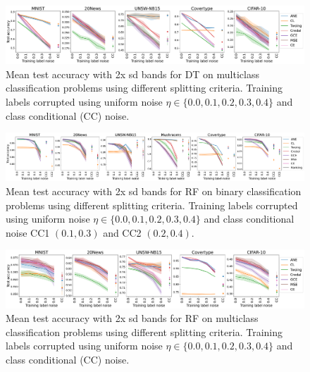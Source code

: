 \documentclass[letterpaper]{article} %
\begin{document}
\begin{figure}[h!]
    \centering
    \includegraphics[width=0.87\linewidth]{figs/multiclass_classification,DT_classfier.pdf}
    \caption{
    Mean test accuracy with 2x sd bands for DT on multiclass classification problems using different splitting criteria.   
    Training labels corrupted using uniform noise $\eta\in\{0.0,0.1,0.2,0.3,0.4\}$ and class conditional (CC) noise.
    }
    \label{fig:dt-mc}
\end{figure}

\begin{figure}[h!]
    \centering
    \includegraphics[width=0.97\linewidth]{figs/binary_classification,RF_classfier.pdf}
    \caption{
    Mean test accuracy with 2x sd bands for RF on binary classification problems using different splitting criteria.   
    Training labels corrupted using 
    uniform noise $\eta\in\{0.0,0.1,0.2,0.3,0.4\}$ and class conditional noise CC1 $(0.1,0.3)$ and CC2 $(0.2,0.4)$.
    }
    \label{fig:rf-bin}
\end{figure}

\begin{figure}[h!]
    \centering
    \includegraphics[width=0.87\linewidth]{figs/multiclass_classification,RF_classfier.pdf}
    \caption{
    Mean test accuracy with 2x sd bands for RF on multiclass classification problems using different splitting criteria.   
    Training labels corrupted using uniform noise $\eta\in\{0.0,0.1,0.2,0.3,0.4\}$ and class conditional (CC) noise.
    }
    \label{fig:rf-mc}
\end{figure}
\end{document}
